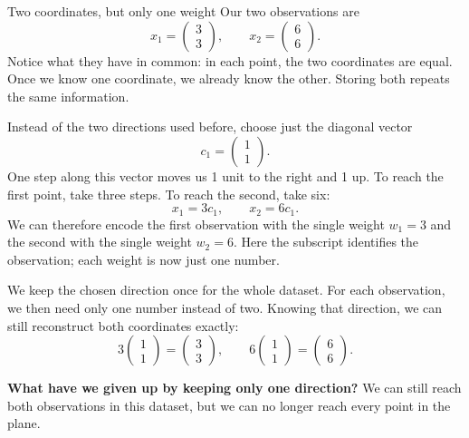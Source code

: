 \documentclass[a4paper,12pt,oneside]{report}
\begin{document}
\begin{framedexample}{Two coordinates, but only one weight}\label{ex:one-weight}
Our two observations are
\[
  x_1=\begin{pmatrix}3\\3\end{pmatrix},\qquad
  x_2=\begin{pmatrix}6\\6\end{pmatrix}.
\]
Notice what they have in common: in each point, the two coordinates
are equal. Once we know one coordinate, we already know the other.
Storing both repeats the same information.

Instead of the two directions used before, choose just the diagonal
vector
\[
  c_1=\begin{pmatrix}1\\1\end{pmatrix}.
\]
One step along this vector moves us 1 unit to the right and 1 up.
To reach the first point, take three steps. To reach the second,
take six:
\[
  x_1=3c_1,\qquad x_2=6c_1.
\]
We can therefore encode the first observation with the single
weight $w_1=3$ and the second with the single weight $w_2=6$.
Here the subscript identifies the observation; each weight is now
just one number.

We keep the chosen direction once for the whole dataset. For each
observation, we then need only one number instead of two. Knowing
that direction, we can still reconstruct both coordinates exactly:
\[
  3\begin{pmatrix}1\\1\end{pmatrix}
    =\begin{pmatrix}3\\3\end{pmatrix},\qquad
  6\begin{pmatrix}1\\1\end{pmatrix}
    =\begin{pmatrix}6\\6\end{pmatrix}.
\]
\end{framedexample}

\textbf{What have we given up by keeping only one direction?}
We can still reach both observations in this dataset, but we can
no longer reach every point in the plane.
\end{document}
